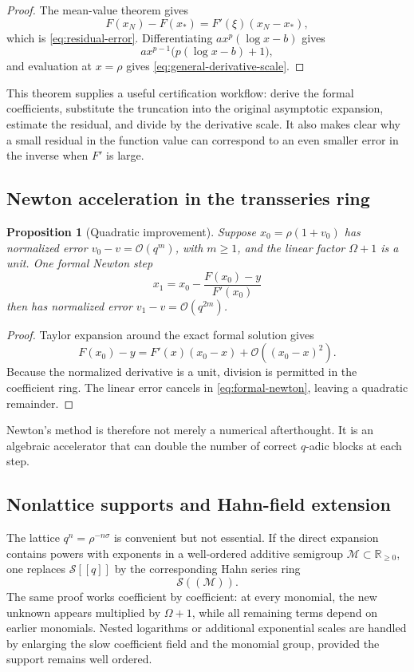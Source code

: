\documentclass[11pt,a4paper]{article}
\numberwithin{equation}{section}
\newtheorem{proposition}[theorem]{Proposition}
\theoremstyle{remark}
\newcommand{\bigO}{\mathcal O}
\begin{document}
\begin{proof}
The mean-value theorem gives
\[
F(x_N)-F(x_*)=F'(\xi)(x_N-x_*),
\]
which is \cref{eq:residual-error}.  Differentiating
\(a x^p(\log x-b)\) gives
\[
a x^{p-1}\bigl(p(\log x-b)+1\bigr),
\]
and evaluation at \(x=\rho\) gives \cref{eq:general-derivative-scale}.
\end{proof}

This theorem supplies a useful certification workflow: derive the formal
coefficients, substitute the truncation into the original asymptotic
expansion, estimate the residual, and divide by the derivative scale.  It
also makes clear why a small residual in the function value can correspond
to an even smaller error in the inverse when \(F'\) is large.

\subsection{Newton acceleration in the transseries ring}

\begin{proposition}[Quadratic improvement]
\label{prop:newton-transseries}
Suppose \(x_0=\rho(1+v_0)\) has normalized error
\(v_0-v=\bigO(q^m)\), with \(m\ge1\), and the linear factor
\(\Omega+1\) is a unit.  One formal Newton step
\begin{equation}
x_1=x_0-\frac{F(x_0)-y}{F'(x_0)}
\label{eq:formal-newton}
\end{equation}
then has normalized error \(v_1-v=\bigO(q^{2m})\).
\end{proposition}

\begin{proof}
Taylor expansion around the exact formal solution gives
\[
F(x_0)-y=F'(x)(x_0-x)+\bigO((x_0-x)^2).
\]
Because the normalized derivative is a unit, division is permitted in the
coefficient ring.  The linear error cancels in \cref{eq:formal-newton},
leaving a quadratic remainder.
\end{proof}

Newton's method is therefore not merely a numerical afterthought.  It is an
algebraic accelerator that can double the number of correct \(q\)-adic
blocks at each step.

\subsection{Nonlattice supports and Hahn-field extension}

The lattice \(q^n=\rho^{-n\sigma}\) is convenient but not essential.  If the
direct expansion contains powers with exponents in a well-ordered additive
semigroup \(\mathcal M\subset\mathbb R_{\ge0}\), one replaces
\(\mathscr S[[q]]\) by the corresponding Hahn series ring
\[
\mathscr S((\mathcal M)).
\]
The same proof works coefficient by coefficient: at every monomial, the new
unknown appears multiplied by \(\Omega+1\), while all remaining terms depend
on earlier monomials.  Nested logarithms or additional exponential scales
are handled by enlarging the slow coefficient field and the monomial group,
provided the support remains well ordered.
\end{document}
